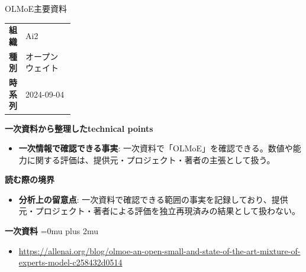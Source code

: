 \begin{technicalnote}{OLMoE}{主要資料}
\begingroup
\begin{tabularx}{\linewidth}{@{}>{\bfseries}p{0.22\linewidth}X@{}}
組織 & Ai2 \\
種別 & オープンウェイト \\
時系列 & 2024-09-04 \\
\end{tabularx}
\smallskip
{\bfseries 一次資料から整理したtechnical points}
\begin{itemize}[leftmargin=1.5em,itemsep=0.35em]
\item \textbf{一次情報で確認できる事実}: 一次資料で「OLMoE」を確認できる。数値や能力に関する評価は、提供元・プロジェクト・著者の主張として扱う。
\end{itemize}
\begin{minipage}{\linewidth}
{\bfseries 読む際の境界}
\begin{itemize}[leftmargin=1.5em,itemsep=0.35em]
\item \textbf{分析上の留意点}: 一次資料で確認できる範囲の事実を記録しており、提供元・プロジェクト・著者による評価を独立再現済みの結果として扱わない。
\end{itemize}
\begin{samepage}
{\bfseries 一次資料}
\begingroup\sloppy
\Urlmuskip=0mu plus 2mu\relax
\begin{itemize}[leftmargin=1.5em,itemsep=0.25em]
\item {\scriptsize\url{https://allenai.org/blog/olmoe-an-open-small-and-state-of-the-art-mixture-of-experts-model-c258432d0514}}
\end{itemize}
\endgroup
\end{samepage}
\end{minipage}
\endgroup
\end{technicalnote}
\medskip

